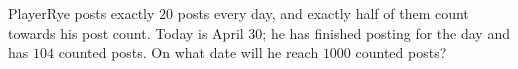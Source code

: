 PlayerRye posts exactly $20$ posts every day, and exactly half of them count towards his post count. Today is April $30$; he has finished posting for the day and has $104$ counted posts. On what date will he reach $1000$ counted posts?
